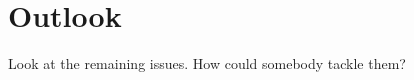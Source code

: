\documentclass[class=article, crop=false]{standalone}
\begin{document}
\chapter{Outlook}\label{cha:outlook}

Look at the remaining issues. How could somebody tackle them?
\end{document}
